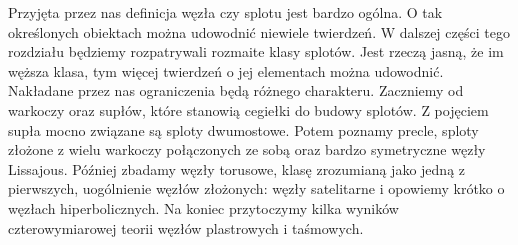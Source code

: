 
Przyjęta przez nas definicja węzła czy splotu jest bardzo ogólna.
O tak określonych obiektach można udowodnić niewiele twierdzeń.
W dalszej części tego rozdziału będziemy rozpatrywali rozmaite klasy splotów.
Jest rzeczą jasną, że im węższa klasa, tym więcej twierdzeń o jej elementach można udowodnić.
Nakładane przez nas ograniczenia będą różnego charakteru.
Zaczniemy od warkoczy oraz supłów, które stanowią cegiełki do budowy splotów.
Z pojęciem supła mocno związane są sploty dwumostowe.
Potem poznamy precle, sploty złożone z wielu warkoczy połączonych ze sobą oraz bardzo symetryczne węzły Lissajous.
Później zbadamy węzły torusowe, klasę zrozumianą jako jedną z pierwszych, uogólnienie węzłów złożonych: węzły satelitarne i opowiemy krótko o węzłach hiperbolicznych.
Na koniec przytoczymy kilka wyników czterowymiarowej teorii węzłów plastrowych i taśmowych.

